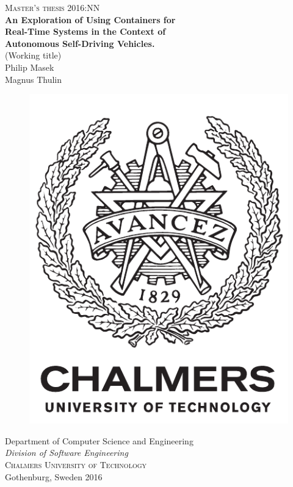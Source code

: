 \newpage
\thispagestyle{empty}
\begin{center}
	\textsc{\large Master's thesis 2016:NN}\\[4cm]		%
	\textbf{\Large An Exploration of Using Containers for \\[0cm] Real-Time Systems 
				in the Context of \\[0.2cm] Autonomous Self-Driving Vehicles.} \\[1cm]
	{\large (Working title)}\\[1cm]
	{\Large Philip Masek}\\[0.4cm]
	{\Large Magnus Thulin}
	
	\vfill	
	\begin{figure}[H]
	\centering
	\includegraphics[width=0.2\pdfpagewidth]{figure/auxiliary/logo_eng.pdf} \\	
	\end{figure}	\vspace{5mm}	
	
	Department of Computer Science and Engineering \\
	\emph{Division of Software Engineering}\\
	\textsc{Chalmers University of Technology} \\
	Gothenburg, Sweden 2016 \\
\end{center}


